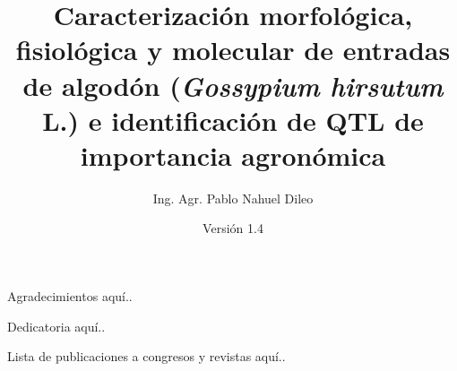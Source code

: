 \documentclass[12pt,oneside]{reedthesis}
\title{Caracterización morfológica, fisiológica y molecular de entradas de algodón (\emph{Gossypium hirsutum} L.) e identificación de QTL de importancia agronómica}
\author{Ing. Agr. Pablo Nahuel Dileo}
\date{Versión 1.4}
\begin{document}
\frontmatter 
\pagestyle{empty} %
\fancyfoot[R]{\thepage}

  \maketitle

  \begin{acknowledgements}
    Agradecimientos aquí..
    \thispagestyle{fancy} %
    \fancyhf{} %
    \fancyhead{} %
    \fancyfoot[R]{\thepage} %
  \end{acknowledgements}

  \begin{dedication}
    Dedicatoria aquí..
    \thispagestyle{fancy} %
    \fancyhf{} %
    \fancyhead{} %
    \fancyfoot[R]{\thepage} %
  \end{dedication}

  \begin{publications}
    Lista de publicaciones a congresos y revistas aquí..
    \thispagestyle{fancy} %
    \fancyhf{} %
    \fancyhead{} %
    \fancyfoot[R]{\thepage} %
  \end{publications}

  \hypersetup{linkcolor=black}
  \setcounter{secnumdepth}{2}
  \setcounter{tocdepth}{2}
  \tableofcontents
  \thispagestyle{fancy} %
    \fancyhf{} %
    \fancyhead{} %
    \fancyfoot[R]{\thepage} %
\end{document}
